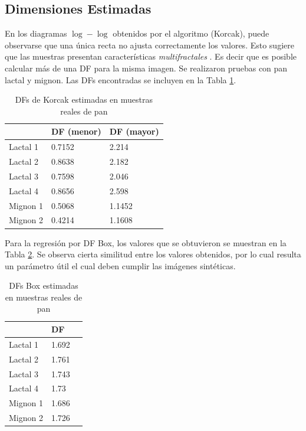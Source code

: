 \subsection{Dimensiones Estimadas}

En los diagramas $\log-\log $ obtenidos por el algoritmo (Korcak), puede observarse que una \'unica recta no ajusta correctamente los valores. Esto sugiere que las muestras presentan caracter\'isticas {\em multifractales} \cite{Mandelbrot1989}. Es decir que es posible calcular m\'as de una DF para la misma imagen. Se realizaron pruebas con pan lactal y mignon. Las DFs encontradas se incluyen en la Tabla \ref{tab:korcak}.

\begin{table}
\center
\begin{tabular}{|| l | l | l ||}
    \hline
     & DF (menor) & DF (mayor) \\    
    \hline
    Lactal 1 & 0.7152 & 2.214 \\
    \hline
    Lactal 2 & 0.8638 & 2.182 \\
    \hline
    Lactal 3 & 0.7598 & 2.046 \\
    \hline
    Lactal 4 & 0.8656 & 2.598 \\
    \hline
    Mignon 1 & 0.5068 & 1.1452\\
    \hline
    Mignon 2 & 0.4214 & 1.1608\\
    \hline
\end{tabular}
\caption{DFs de Korcak estimadas en muestras reales de pan}
\label{tab:korcak}
\end{table}


Para la regresi\'on por DF Box, los valores que se obtuvieron se muestran en la Tabla \ref{tab:box}.
Se observa cierta similitud entre los valores obtenidos, por lo cual resulta un par\'ametro \'util el cual deben cumplir las im\'agenes sint\'eticas.

\begin{table}
\begin{center}
\begin{tabular}{|| l | l | l ||}
    \hline
     & DF \\    
    \hline
    Lactal 1 & 1.692 \\
    \hline
    Lactal 2 & 1.761 \\
    \hline
    Lactal 3 & 1.743\\
    \hline
    Lactal 4 & 1.73 \\
    \hline
    Mignon 1 & 1.686 \\
    \hline
    Mignon 2 & 1.726 \\
    \hline
\end{tabular}
\caption{DFs Box estimadas en muestras reales de pan}
\label{tab:box}
\end{center}
\end{table}

